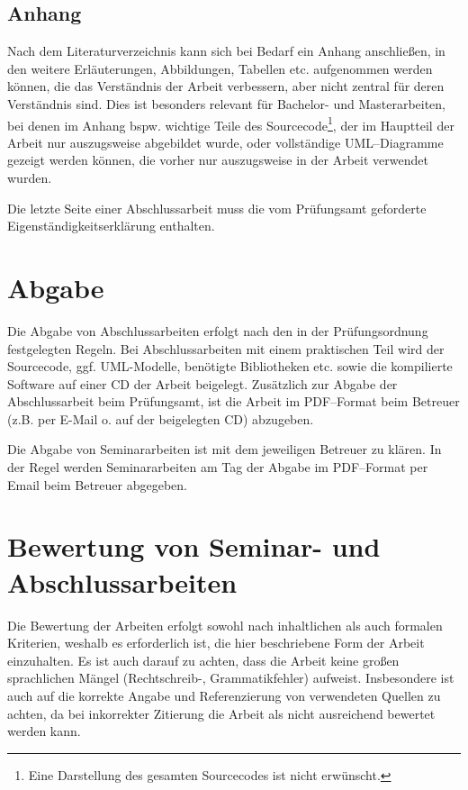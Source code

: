 \subsection{Anhang}

Nach dem Literaturverzeichnis kann sich bei Bedarf ein Anhang anschließen, in den weitere
Erläuterungen, Abbildungen, Tabellen etc. aufgenommen werden können, die das
Verständnis der Arbeit verbessern, aber nicht zentral für deren Verständnis sind. Dies
ist besonders relevant für Bachelor- und Masterarbeiten, bei denen im Anhang bspw. wichtige Teile
des Sourcecode\footnote{Eine Darstellung des gesamten Sourcecodes ist nicht erwünscht.}, 
der im Hauptteil der Arbeit nur auszugsweise abgebildet wurde, oder
vollständige UML--Diagramme gezeigt werden können, die vorher nur auszugsweise in der
Arbeit verwendet wurden. 

Die letzte Seite einer Abschlussarbeit muss die vom Prüfungsamt geforderte Eigenständigkeitserklärung enthalten.

\newpage
\section{Abgabe}

Die Abgabe von Abschlussarbeiten erfolgt nach den in der Prüfungsordnung festgelegten Regeln. 
Bei Abschlussarbeiten mit einem praktischen Teil wird der Sourcecode,
ggf. UML-Modelle, benötigte Bibliotheken etc. sowie die kompilierte Software auf einer CD
der Arbeit beigelegt. Zusätzlich zur Abgabe der Abschlussarbeit beim Prüfungsamt,
ist die Arbeit im PDF--Format beim Betreuer (z.B. per E-Mail o. auf der beigelegten
CD) abzugeben.

Die Abgabe von Seminararbeiten ist mit dem jeweiligen Betreuer zu klären. In
der Regel werden Seminararbeiten am Tag der Abgabe im PDF--Format per Email beim
Betreuer abgegeben. 

\section{Bewertung von Seminar- und Abschlussarbeiten}

Die Bewertung der Arbeiten erfolgt sowohl nach inhaltlichen als auch formalen Kriterien,
weshalb es erforderlich ist, die hier beschriebene Form der Arbeit einzuhalten.
Es ist auch darauf zu achten, dass die Arbeit keine großen sprachlichen Mängel
(Rechtschreib-, Grammatikfehler) aufweist. Insbesondere ist auch auf die korrekte Angabe
und Referenzierung von verwendeten Quellen zu achten, da bei inkorrekter Zitierung
die Arbeit als nicht ausreichend bewertet werden kann.


